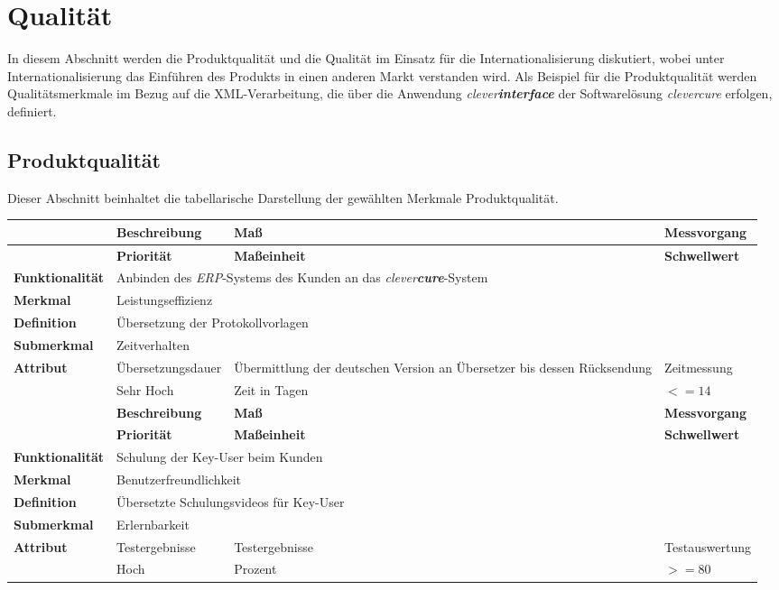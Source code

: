 \section{Qualität}
\label{sec:quality}
In diesem Abschnitt werden die Produktqualität und die Qualität im Einsatz für die Internationalisierung diskutiert, wobei unter Internationalisierung das Einführen des Produkts in einen anderen Markt verstanden wird.
\newline
\newline
Als Beispiel für die Produktqualität werden Qualitätsmerkmale im Bezug auf die XML-Verarbeitung, die über die Anwendung \emph{clever\textbf{interface}} der Softwarelösung \emph{clevercure} erfolgen, definiert.
\subsection{Produktqualität}
\label{sec:qualtity-product-quality}
Dieser Abschnitt beinhaltet die tabellarische Darstellung der gewählten Merkmale Produktqualität.
\newline
\bgroup
\def\arraystretch{1.5}%
\begin{tabularx}{\textwidth}{ p{70pt} | X | X | X }
	\hline
	& \textbf{Beschreibung} & \textbf{Maß} & \textbf{Messvorgang} \\ \hline
	& \textbf{Priorität} & \textbf{Maßeinheit} & \textbf{Schwellwert} \\ \hline
	\textbf{Funktionalität} & \multicolumn{3}{p{300pt}}{Anbinden des \emph{ERP}-Systems des Kunden an das \emph{clever\textbf{cure}}-System} \\ \hline
	\textbf{Merkmal} & \multicolumn{3}{X}{Leistungseffizienz} \\ \hline
	\textbf{Definition} & \multicolumn{3}{p{380pt}}{Übersetzung der Protokollvorlagen} \\ \hline
	\textbf{Submerkmal} & \multicolumn{3}{X}{Zeitverhalten} \\ \hline 
	\textbf{Attribut} & Übersetzungsdauer & Übermittlung der deutschen Version an Übersetzer bis dessen Rücksendung & Zeitmessung  \\ \hline
	               & Sehr Hoch               & Zeit in Tagen & $<= 14$  \\ 
    \hline 
    \hline 
	& \textbf{Beschreibung} & \textbf{Maß} & \textbf{Messvorgang} \\ \hline
	& \textbf{Priorität} & \textbf{Maßeinheit} & \textbf{Schwellwert} \\ \hline
	\textbf{Funktionalität} & \multicolumn{3}{p{300pt}}{Schulung der Key-User beim Kunden} \\ \hline
	\textbf{Merkmal} & \multicolumn{3}{X}{Benutzerfreundlichkeit} \\ \hline
	\textbf{Definition} & \multicolumn{3}{p{380pt}}{Übersetzte Schulungsvideos für Key-User} \\ \hline
	\textbf{Submerkmal} & \multicolumn{3}{X}{Erlernbarkeit} \\ \hline 
	\textbf{Attribut} & Testergebnisse & Testergebnisse  & Testauswertung  \\ \hline
	& Hoch               & Prozent & $>= 80$  \\ \hline
\end{tabularx}
